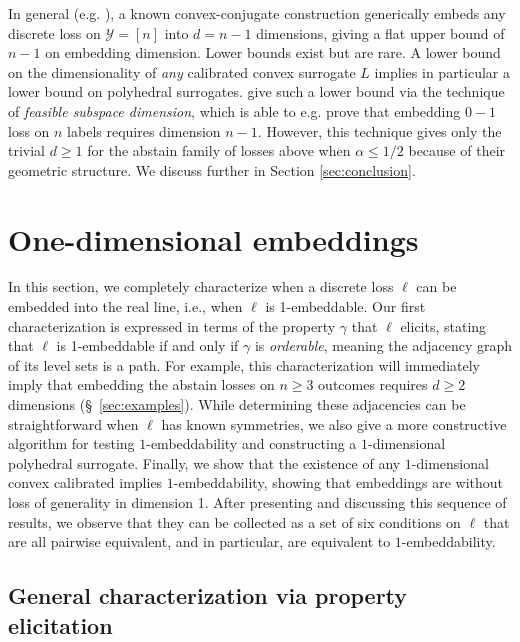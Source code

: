 \documentclass[anon]{colt2020} %
\newcommand{\Y}{\mathcal{Y}}
\begin{document}
In general (e.g. \cite{finocchiaro2019embedding}), a known convex-conjugate construction generically embeds any discrete loss on $\Y = [n]$ into $d = n-1$ dimensions, giving a flat upper bound of $n-1$ on embedding dimension.
Lower bounds exist but are rare.
A lower bound on the dimensionality of \emph{any} calibrated convex surrogate $L$ implies in particular a lower bound on polyhedral surrogates.
\cite{ramaswamy2016convex} give such a lower bound via the technique of \emph{feasible subspace dimension}, which is able to e.g. prove that embedding $0-1$ loss on $n$ labels requires dimension $n-1$.
However, this technique gives only the trivial $d \geq 1$ for the abstain family of losses above when $\alpha \leq 1/2$ because of their geometric structure.
We discuss further in Section \ref{sec:conclusion}.


\section{One-dimensional embeddings}
\label{sec:1d}

In this section, we completely characterize when a discrete loss $\ell$ can be embedded into the real line, i.e., when $\ell$ is 1-embeddable.
Our first characterization is expressed in terms of the property $\gamma$ that $\ell$ elicits, stating that $\ell$ is 1-embeddable if and only if $\gamma$ is \emph{orderable}, meaning the adjacency graph of its level sets is a path.
For example, this characterization will immediately imply that embedding the abstain losses on $n \geq 3$ outcomes requires $d \geq 2$ dimensions (\S~\ref{sec:examples}).
While determining these adjacencies can be straightforward when $\ell$ has known symmetries, we also give a more constructive algorithm for testing $1$-embeddability and constructing a $1$-dimensional polyhedral surrogate.
Finally, we show that the existence of any $1$-dimensional convex calibrated implies $1$-embeddability, showing that embeddings are without loss of generality in dimension 1.
After presenting and discussing this sequence of results, we observe that they can be collected as a set of six conditions on $\ell$ that are all pairwise equivalent, and in particular, are equivalent to $1$-embeddability.

\subsection{General characterization via property elicitation}
\end{document}
